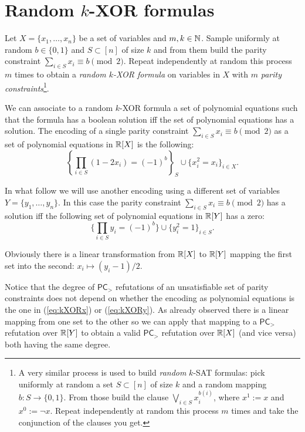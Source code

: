 \documentclass[a4paper,twoside,justified]{tufte-handout}
\begin{document}
\section{Random $k$-XOR formulas}

Let $X=\{x_1,\ldots,x_n\}$ be a set of variables and $m,k\in \mathbb{N}$. Sample uniformly at random $b\in \{0,1\}$ and $S\subset [n]$ of size $k$ and from them build the parity constraint $\sum_{i\in S}x_i \equiv b \pmod{2}$.
Repeat independently at random this process $m$ times to obtain a \emph{random $k$-XOR formula} on variables in $X$ with $m$ \emph{parity constraints}\footnote{A very similar process is used to build \emph{random} $k$-SAT formulas: pick uniformly at random a set $S\subset [n]$ of size $k$ and a random mapping $b:S\rightarrow \{0,1\}$. From those build the clause $\bigvee_{i\in S} x_i^{b(i)}$, where $x^1:=x$ and $x^0:=\neg x$. Repeat independently at random this process $m$ times and take the conjunction of the clauses you get.}. 

We can associate to a random $k$-XOR formula a set of polynomial equations such that the formula has a boolean solution iff the set of polynomial equations has a solution. 
The encoding of a single parity constraint $\sum_{i\in S}x_i \equiv b \pmod{2}$ as a set of polynomial equations in $\mathbb{R}[X]$ is the following:
\begin{equation}\label{eq:kXORx}
\left\{\prod_{i\in S}(1-2x_i) = (-1)^b \right\}_S \cup \{x_i^2=x_i\}_{i \in X}.
\end{equation} 

In what follow we will use another encoding using a different set of variables $Y=\{y_1,\ldots,y_n\}$.
 In this case the parity constraint $\sum_{i\in S}x_i  \equiv b \pmod{2}$ has a solution iff the following set of polynomial equations in $\mathbb{R}[Y]$ has a zero:
\begin{equation}\label{eq:kXORy}
\{\prod_{i\in S}y_i = (-1)^b \}\cup \{y_i^2=1\}_{i\in S}.
\end{equation} 

Obviously there is a linear transformation from $\mathbb{R}[X]$ to $\mathbb{R}[Y]$ mapping the first set into the second: $x_i\mapsto (y_i-1)/2$.

Notice that the degree of $\mathsf{PC}_>$ refutations of an unsatisfiable set of parity constraints does not depend on whether the encoding as polynomial equations is the one in (\ref{eq:kXORx}) or (\ref{eq:kXORy}). 
As already observed there is a linear mapping from one set to the other so we can apply that mapping to a $\mathsf{PC}_>$ refutation over $\mathbb{R}[Y]$ to obtain a valid $\mathsf{PC}_>$ refutation over $\mathbb{R}[X]$ (and vice versa) both having the same degree.
\end{document}
